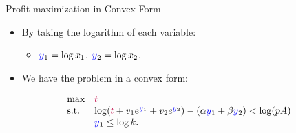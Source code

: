 \documentclass[10pt,ignorenonframetext,serif,onlymath]{beamer}
\providecommand{\tightlist}{%
  \setlength{\itemsep}{0pt}\setlength{\parskip}{0pt}}
\begin{document}
\begin{frame}{Profit maximization in Convex Form}
\protect\hypertarget{profit-maximization-in-convex-form}{}

\begin{itemize}
\item
  By taking the logarithm of each variable:

  \begin{itemize}
  \tightlist
  \item
    \({\color{blue}y}_1 = \log x_1\), \({\color{blue}y}_2 = \log x_2\).
  \end{itemize}
\item
  We have the problem in a convex form:
\end{itemize}

\[\begin{array}{ll}
    \text{max}  & {\color{purple}t} \\
    \text{s.t.} & \log({\color{purple}t} + v_1 e^{{\color{blue}y}_1} + v_2 e^{{\color{blue}y}_2}) - (\alpha {\color{blue}y}_1 + \beta {\color{blue}y}_2) < \log(pA) \\
                & {\color{blue}y}_1 \le \log k.
\end{array}\]

\end{frame}
\end{document}
